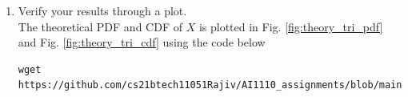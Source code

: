 \documentclass[journal,12pt,twocolumn]{IEEEtran}
\renewcommand\thesection{\arabic{section}}
\begin{document}
\begin{enumerate}[label=\thesection.\arabic*
,ref=\thesection.\theenumi]
\begin{align}
\begin{cases}
    	\int^{x}_{0} 1d\tau & 0 < x \le 1 \\
    	\int^{1}_{x-1} 1 d\tau & 1 < x \le 2 \\
    	0 & 2 \le x 
    	\end{cases} 
\end{align}
\begin{align}
	p_T\brak{x} &=
    	\begin{cases} 
    	0 & x \le 0 \\
    	x & 0 \le x < 1 \\
    	2-x & 1 \le x < 2 \\
    	0 & 2 \le x 
    	\end{cases} 
\end{align}
We integrate PDF to find CDF,
\begin{align}
	F_T\brak{x} &= \int_{-\infty}^{x} p_t\brak{z} dz \\
	F_T\brak{x} &=
    	\begin{cases} 
    	\int_{-\infty}^{x} 0dz & x \le 0 \\
    	F_T\brak{0} + \int_{0}^{x} z dz & 0 \le x < 1 \\
   		F_T\brak{1} + \int_{1}^{x} \brak{2-z} dz & 1 \le x < 2 \\
    	F_T\brak{2} + \int_{2}^{x} 0 dz & 2 \le x 
    	\end{cases} \\
	F_T\brak{x} &=
    	\begin{cases} 
    	0 & x \le 0 \\
    	\frac{x^2}{2} & 0 \le x < 1 \\
   		-\frac{x^2}{2} +2x - 1 & 1 \le x < 2 \\ 
    	1 & 2 \le x 
    	\end{cases} 
\end{align}
\item Verify your results through a plot. \\
\solution The theoretical PDF and CDF of $X$ is plotted in Fig. \ref{fig:theory_tri_pdf} and Fig.  \ref{fig:theory_tri_cdf}  using the code below
\begin{lstlisting}
wget https://github.com/cs21btech11051Rajiv/AI1110_assignments/blob/main/manual1/code/q4/4p5.c
\end{lstlisting}
\begin{figure}[ht!]
    \centering

\end{figure}
\end{enumerate}
\end{document}
